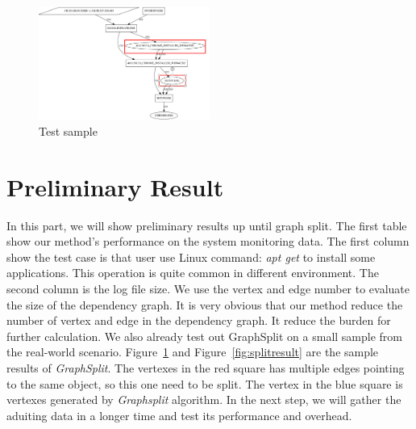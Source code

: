 
 \begin{figure}[t]
	\centering
	\includegraphics[width=0.5\textwidth]{testSample.png}
	\caption{Test sample}
	\label{fig:splitsample}
\end{figure} 

\section{Preliminary Result}

In this part, we will show preliminary results up until graph split. The first table show our method's performance on the system monitoring data. The first column show the test case is that user use Linux command: \textit{apt get} to install some applications. This operation is quite common in different environment. The second column is the log file size. We use the vertex and edge number to evaluate the size of the dependency graph. It is very obvious that our method reduce the number of vertex and edge in the dependency graph.  It reduce the burden for further calculation. We also already test out GraphSplit on a small sample from the real-world scenario. Figure~\ref{fig:splitsample} and Figure~\ref{fig:splitresult} are the sample results of \emph{GraphSplit}. The vertexes in the red square has multiple edges pointing to the same object, so this one need to be split. The vertex in the blue square is vertexes generated by \emph{Graphsplit} algorithm. In the next step, we will gather the aduiting data in a longer time and test its performance and overhead. 



